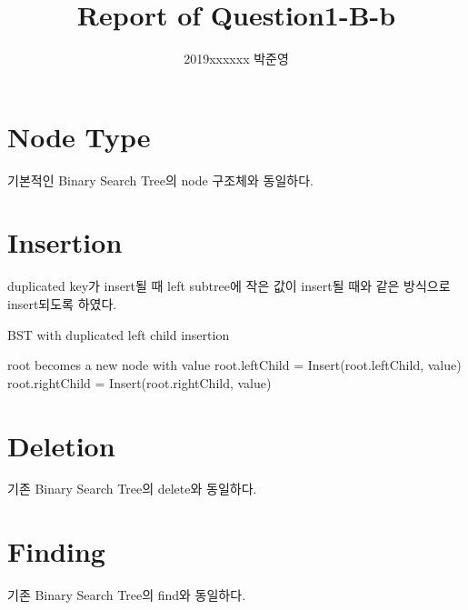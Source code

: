 \documentclass[a4paper, 11pt]{article}
\title{Report of Question1-B-b}
\author{2019xxxxxx 박준영}
\date{}
\begin{document}
\maketitle


\section{Node Type}
기본적인 Binary Search Tree의 node 구조체와 동일하다.

\section{Insertion}
duplicated key가 insert될 때 left subtree에 작은 값이 insert될 때와 같은 방식으로 insert되도록 하였다.
\\

\begin{algorithm}
	\caption{BST with duplicated left child insertion}
	\begin{algorithmic}
				\State root becomes a new node with value
				\State root.leftChild = Insert(root.leftChild, value)
				\State root.rightChild = Insert(root.rightChild, value)
			\EndIf
			
			\State {}
		\EndFunction
	\end{algorithmic}
\end{algorithm}

\section{Deletion}
기존 Binary Search Tree의 delete와 동일하다.

\section{Finding}
기존 Binary Search Tree의 find와 동일하다.
\end{document}
